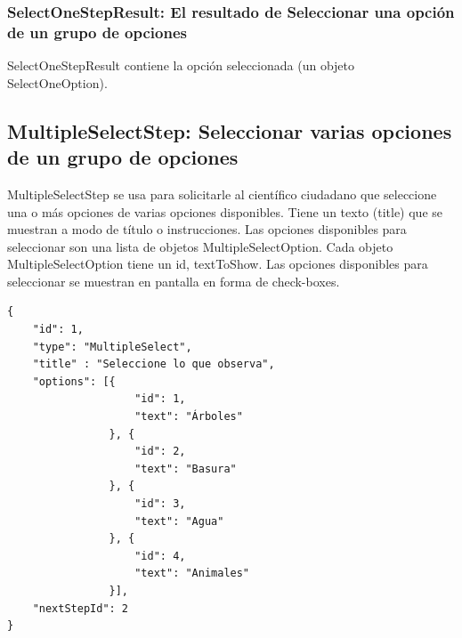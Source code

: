 \subsubsection{SelectOneStepResult: El resultado de Seleccionar una opción de un grupo de opciones}
SelectOneStepResult contiene la opción seleccionada (un objeto SelectOneOption).





\subsection{MultipleSelectStep: Seleccionar varias opciones de un grupo de opciones}
MultipleSelectStep  se usa para solicitarle al científico ciudadano que seleccione una o más opciones de varias opciones disponibles. Tiene un texto (title) que se muestran a modo de título o instrucciones. Las opciones disponibles para seleccionar son una lista de objetos MultipleSelectOption.
Cada objeto MultipleSelectOption tiene un id, textToShow.
Las opciones disponibles para seleccionar se muestran en pantalla en forma de check-boxes.

\clearpage

\begin{lstlisting}[language=XML, frame=tlbr, caption=MultipleSelectStep usando el generador de clases.]	
{
	"id": 1,
	"type": "MultipleSelect",
	"title" : "Seleccione lo que observa",
	"options": [{
					"id": 1,
					"text": "Árboles"
				}, {
					"id": 2,
					"text": "Basura"
				}, {
					"id": 3,
					"text": "Agua"
				}, {
					"id": 4,
					"text": "Animales"
				}],
	"nextStepId": 2
}
\end{lstlisting}


